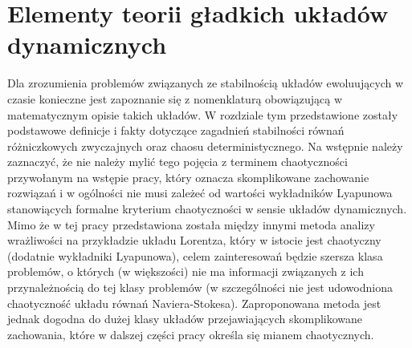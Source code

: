 \documentclass[12pt]{article}
\begin{document}
\section{Elementy teorii gładkich układów dynamicznych}
Dla zrozumienia problemów związanych ze stabilnością układów ewoluujących w czasie konieczne jest zapoznanie się z nomenklaturą obowiązującą w matematycznym opisie takich układów. W rozdziale tym przedstawione zostały podstawowe definicje i fakty dotyczące zagadnień stabilności równań różniczkowych zwyczajnych oraz chaosu deterministycznego. Na wstępnie należy zaznaczyć, że nie należy mylić tego pojęcia z terminem chaotyczności przywołanym na wstępie pracy, który oznacza skomplikowane zachowanie rozwiązań i w ogólności nie musi zależeć od wartości wykładników Lyapunowa stanowiących formalne kryterium chaotyczności w sensie układów dynamicznych. Mimo że w tej pracy przedstawiona została między innymi metoda analizy wrażliwości na przykładzie układu Lorentza, który w istocie jest chaotyczny (dodatnie wykładniki Lyapunowa), celem zainteresowań będzie szersza klasa problemów, o których (w większości) nie ma informacji związanych z ich przynależnością do tej klasy problemów (w szczególności nie jest udowodniona chaotyczność układu równań Naviera-Stokesa). Zaproponowana metoda jest jednak dogodna do dużej klasy układów przejawiających skomplikowane zachowania, które w dalszej części pracy określa się mianem chaotycznych.\newline
\end{document}

